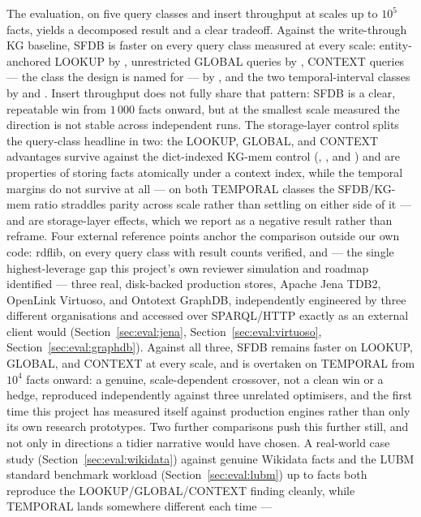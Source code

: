 The evaluation, on five query classes and insert throughput at
\benchscalecount{} scales up to $10^5$ facts, yields a decomposed result
and a clear tradeoff. Against the write-through KG baseline, SFDB is
faster on every query class measured at every scale: entity-anchored
LOOKUP by \rangelookupkg{}, unrestricted GLOBAL
queries by \rangeglobalkg{}, CONTEXT queries --- the class the design
is named for --- by \rangecontextkg{}, and the two temporal-interval
classes by
\rangetemporalkg{} and \rangetemporalunbkg{}. Insert throughput does not
fully
share that pattern: SFDB is a clear, repeatable win from $1\,000$ facts
onward, but at the smallest scale measured the direction is not stable
across independent runs. The storage-layer control
splits the query-class headline in two: the LOOKUP, GLOBAL, and CONTEXT
advantages survive
against the dict-indexed KG-mem control (\rangelookupkgmem{},
\rangeglobalkgmem{}, and \rangecontextkgmem{}) and are properties of
storing facts atomically
under a context index, while the temporal margins do not survive at
all --- on both TEMPORAL classes the SFDB/KG-mem ratio straddles
parity across scale rather than settling on either side of it --- and are storage-layer effects,
which we report as a negative result rather than reframe. Four
external reference points anchor the comparison outside our own code:
rdflib, on every query class with result
counts verified, and --- the single highest-leverage gap this project's
own reviewer simulation and roadmap identified --- three real, disk-backed
production stores, Apache Jena TDB2, OpenLink Virtuoso, and Ontotext
GraphDB, independently
engineered by three different organisations and accessed over SPARQL/HTTP
exactly as an external client would (Section~\ref{sec:eval:jena},
Section~\ref{sec:eval:virtuoso}, Section~\ref{sec:eval:graphdb}). Against all three, SFDB
remains faster on LOOKUP, GLOBAL, and CONTEXT at every scale, and is overtaken on
TEMPORAL from $10^4$ facts onward: a genuine, scale-dependent
crossover, not a clean win or a hedge, reproduced independently against
three unrelated optimisers, and the first time this project has
measured itself against production engines rather than only its own
research prototypes. Two further comparisons push this further still,
and not only in directions a tidier narrative would have chosen. A
real-world case study
(Section~\ref{sec:eval:wikidata}) against \wikidatanumfacts{} genuine
Wikidata facts and the LUBM standard benchmark workload
(Section~\ref{sec:eval:lubm}) up to \lubmlargescale{} facts both
reproduce the LOOKUP/GLOBAL/CONTEXT
finding cleanly, while TEMPORAL lands somewhere different each time ---
